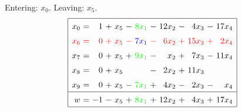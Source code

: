 \documentclass[11pt]{article}
\begin{document}
Entering: $x_{0}$. Leaving: $x_{5}$. 
\begin{equation*}
\renewcommand{\arraystretch}{1.5} %
\begin{array}{|rcrcrcrcrcrcr|}
\hline
x_{0} \mspace{-6mu}&\mspace{-6mu} = \mspace{-6mu}&\mspace{-6mu} 1 \mspace{-6mu}&\mspace{-6mu} + \mspace{-6mu}&\mspace{-6mu} x_{5} \mspace{-6mu}&\mspace{-6mu} - \mspace{-6mu}&\color{green}\mspace{-6mu} 8 x_{1} \mspace{-6mu}&\mspace{-6mu} - \mspace{-6mu}&\mspace{-6mu} 12 x_{2} \mspace{-6mu}&\mspace{-6mu} - \mspace{-6mu}&\mspace{-6mu} 4 x_{3} \mspace{-6mu}&\mspace{-6mu} - \mspace{-6mu}&\mspace{-6mu} 17 x_{4}\\
\color{red}x_{6} \mspace{-6mu}&\color{red}\mspace{-6mu} = \mspace{-6mu}&\color{red}\mspace{-6mu} 0 \mspace{-6mu}&\color{red}\mspace{-6mu} + \mspace{-6mu}&\color{red}\mspace{-6mu} x_{5} \mspace{-6mu}&\color{red}\mspace{-6mu} - \mspace{-6mu}&\color{blue}\mspace{-6mu} 7 x_{1} \mspace{-6mu}&\color{red}\mspace{-6mu} - \mspace{-6mu}&\color{red}\mspace{-6mu} 6 x_{2} \mspace{-6mu}&\color{red}\mspace{-6mu} + \mspace{-6mu}&\color{red}\mspace{-6mu} 15 x_{3} \mspace{-6mu}&\color{red}\mspace{-6mu} + \mspace{-6mu}&\color{red}\mspace{-6mu} 2 x_{4}\\
x_{7} \mspace{-6mu}&\mspace{-6mu} = \mspace{-6mu}&\mspace{-6mu} 0 \mspace{-6mu}&\mspace{-6mu} + \mspace{-6mu}&\mspace{-6mu} x_{5} \mspace{-6mu}&\mspace{-6mu} + \mspace{-6mu}&\color{green}\mspace{-6mu} 9 x_{1} \mspace{-6mu}&\mspace{-6mu} - \mspace{-6mu}&\mspace{-6mu} x_{2} \mspace{-6mu}&\mspace{-6mu} + \mspace{-6mu}&\mspace{-6mu} 7 x_{3} \mspace{-6mu}&\mspace{-6mu} - \mspace{-6mu}&\mspace{-6mu} 11 x_{4}\\
x_{8} \mspace{-6mu}&\mspace{-6mu} = \mspace{-6mu}&\mspace{-6mu} 0 \mspace{-6mu}&\mspace{-6mu} + \mspace{-6mu}&\mspace{-6mu} x_{5} \mspace{-6mu}&\mspace{-6mu}  \mspace{-6mu}&\color{green}\mspace{-6mu}  \mspace{-6mu}&\mspace{-6mu} - \mspace{-6mu}&\mspace{-6mu} 2 x_{2} \mspace{-6mu}&\mspace{-6mu} + \mspace{-6mu}&\mspace{-6mu} 11 x_{3} \mspace{-6mu}&\mspace{-6mu}  \mspace{-6mu}&\mspace{-6mu} \\
x_{9} \mspace{-6mu}&\mspace{-6mu} = \mspace{-6mu}&\mspace{-6mu} 0 \mspace{-6mu}&\mspace{-6mu} + \mspace{-6mu}&\mspace{-6mu} x_{5} \mspace{-6mu}&\mspace{-6mu} - \mspace{-6mu}&\color{green}\mspace{-6mu} 7 x_{1} \mspace{-6mu}&\mspace{-6mu} + \mspace{-6mu}&\mspace{-6mu} 4 x_{2} \mspace{-6mu}&\mspace{-6mu} - \mspace{-6mu}&\mspace{-6mu} 2 x_{3} \mspace{-6mu}&\mspace{-6mu} - \mspace{-6mu}&\mspace{-6mu} x_{4}\\
\hline
w \mspace{-6mu}&\mspace{-6mu} = \mspace{-6mu}&\mspace{-6mu} -1 \mspace{-6mu}&\mspace{-6mu} - \mspace{-6mu}&\mspace{-6mu} x_{5} \mspace{-6mu}&\mspace{-6mu} + \mspace{-6mu}&\color{green}\mspace{-6mu} 8 x_{1} \mspace{-6mu}&\mspace{-6mu} + \mspace{-6mu}&\mspace{-6mu} 12 x_{2} \mspace{-6mu}&\mspace{-6mu} + \mspace{-6mu}&\mspace{-6mu} 4 x_{3} \mspace{-6mu}&\mspace{-6mu} + \mspace{-6mu}&\mspace{-6mu} 17 x_{4}\\
\hline
\end{array}
\end{equation*}
\end{document}
